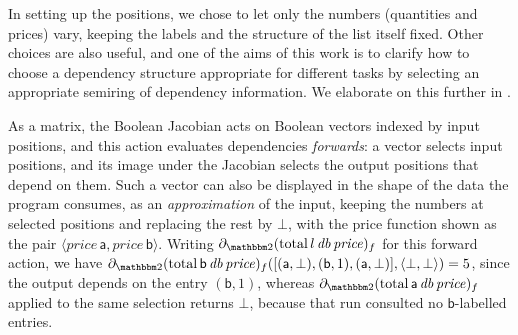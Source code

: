 \begin{example}
  In setting up the positions, we chose to let only the numbers (quantities and prices) vary, keeping the
  labels and the structure of the list itself fixed. Other choices are also useful, and one of the aims of
  this work is to clarify how to choose a dependency structure appropriate for different tasks by selecting an
  appropriate semiring of dependency information. We elaborate on this further in .

  As a matrix, the Boolean Jacobian acts on Boolean vectors indexed by input positions, and this action
  evaluates dependencies \emph{forwards}: a vector selects input positions, and its image under the Jacobian
  selects the output positions that depend on them. Such a vector can also be displayed in the shape of the
  data the program consumes, as an \emph{approximation} of the input, keeping the numbers at selected
  positions and replacing the rest by $\bot$, with the price function shown as the pair $\langle
  \mathit{price}\,\mathsf{a}, \mathit{price}\,\mathsf{b} \rangle$. Writing
  $\partial_{\Two}(\mathrm{total}\,l\,\mathit{db}\,\mathit{price})_f$ for this forward action, we have
  $\partial_{\Two}(\mathrm{total}\,\mathsf{b}\,\mathit{db}\,\mathit{price})_f([(\mathsf{a},\bot),(\mathsf{b},1),(\mathsf{a},\bot)],
  \langle \bot, \bot \rangle) = 5$, since the output depends on the entry $(\mathsf{b},1)$, whereas
  $\partial_{\Two}(\mathrm{total}\,\mathsf{a}\,\mathit{db}\,\mathit{price})_f$ applied to the same selection
  returns $\bot$, because that run consulted no $\mathsf{b}$-labelled entries.


\end{example}
